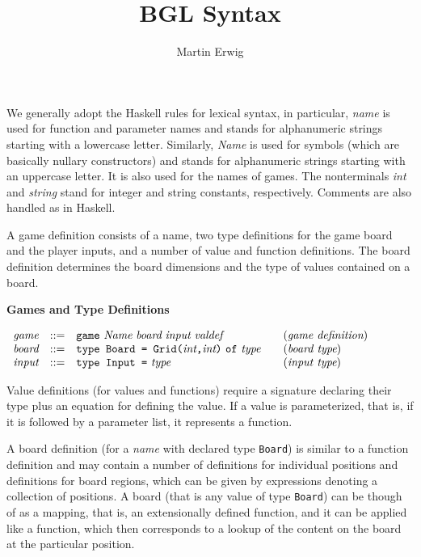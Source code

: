\documentclass[11pt]{article}
\makeatletter
\newcommand{\prodName}[1]{&(\emph{#1})\\}
\newcommand{\nt}[1]{\textit{#1}}
\newcommand{\prog}[1]{\texttt{#1}}
\newcommand{\IS}{&::=&}
\newcommand{\syntax}[2]{
  \needspace{3\baselineskip}
  \bigskip\par\noindent\textbf{#1}\par\smallskip%
  $\begin{array}{rcl@{\qquad}l}#2\end{array}$%
  \par\bigskip\noindent\ignorespaces
}
\newcommand{\lp}{\prog{(}}
\newcommand{\rp}{\prog{)}}
\newcommand{\paren}[1]{\lp#1\rp}
\newcommand{\pair}[2]{\paren{#1\prog{,}#2}}
\makeatother
\begin{document}
\title{BGL Syntax}
\author{Martin Erwig}
\maketitle

\noindent
%
We generally adopt the Haskell rules for lexical syntax, in particular,
\nt{name} is used for function and parameter names and stands for alphanumeric
strings starting with a lowercase letter.
%
Similarly, \nt{Name} is used for symbols (which are basically nullary
constructors) and stands for alphanumeric strings starting with an uppercase
letter. It is also used for the names of games.
%
The nonterminals \nt{int} and \nt{string} stand for integer and string
constants, respectively.
%
Comments are also handled as in Haskell.

A game definition consists of a name, two type definitions for the game board
and the player inputs, and a number of value and function definitions.
%
The board definition determines the board dimensions and the type of values
contained on a board.

\syntax{Games and Type Definitions}{
\nt{game}   \IS  \prog{game}\ \nt{Name}\ \nt{board}\ \nt{input}\ \nt{valdef}
                                                     \prodName{game definition}
\nt{board}  \IS  \prog{type Board = Grid}\pair{\nt{int}}{\nt{int}}\
                 \prog{of}\ \nt{type}                \prodName{board type}
\nt{input}  \IS  \prog{type Input =}\ \nt{type}      \prodName{input type}
}
%
Value definitions (for values and functions) require a signature declaring
their type plus an equation for defining the value. If a value is
parameterized, that is, if it is followed by a parameter list, it represents a
function.

A board definition (for a \nt{name} with declared type \prog{Board}) is similar
to a function definition and may contain a number of definitions for individual
positions and definitions for board regions, which can be given by expressions
denoting a collection of positions.
%
A board (that is any value of type \prog{Board}) can be though of as a mapping,
that is, an extensionally defined function, and it can be applied like a
function, which then corresponds to a lookup of the content on the board at the
particular position.
\end{document}
